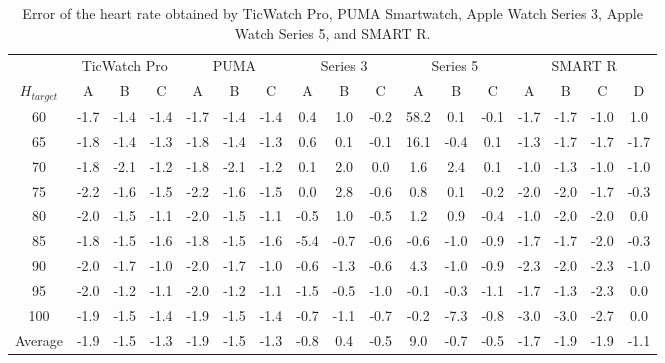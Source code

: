 \documentclass[sigchi,authordraft]{acmart}
\begin{document}
\begin{table}[!t]
  \centering
  \caption{Error of the heart rate obtained by TicWatch Pro, PUMA Smartwatch, Apple Watch Series 3, Apple Watch Series 5, and SMART R.}
  \begin{tabular}{c|ccc|ccc|ccc|ccc|cccc} 
  \toprule
    &\multicolumn{3}{c|}{TicWatch Pro}&\multicolumn{3}{c|}{PUMA}&\multicolumn{3}{c|}{Series 3}&\multicolumn{3}{c|}{Series 5}&\multicolumn{4}{c}{SMART R}\\
    $H_{target}$ & A & B & C & A & B & C & A & B & C & A & B & C & A & B & C & D\\    \midrule
    60 & -1.7 & -1.4 & -1.4 & -1.7 & -1.4 & -1.4 & 0.4 & 1.0 & -0.2 & 58.2 & 0.1 & -0.1 & -1.7 & -1.7 & -1.0 & 1.0\\
    65 & -1.8 & -1.4 & -1.3 & -1.8 & -1.4 & -1.3 & 0.6 & 0.1 & -0.1 & 16.1 & -0.4 & 0.1 & -1.3 & -1.7 & -1.7 & -1.7\\
    70 & -1.8 & -2.1 & -1.2 & -1.8 & -2.1 & -1.2 & 0.1 & 2.0 & 0.0 & 1.6 & 2.4 & 0.1 & -1.0 & -1.3 & -1.0 & -1.0\\
    75 & -2.2 & -1.6 & -1.5 & -2.2 & -1.6 & -1.5 & 0.0 & 2.8 & -0.6 & 0.8 & 0.1 & -0.2 & -2.0 & -2.0 & -1.7 & -0.3\\
    80 & -2.0 & -1.5 & -1.1 & -2.0 & -1.5 & -1.1 & -0.5 & 1.0 & -0.5 & 1.2 & 0.9 & -0.4 & -1.0 & -2.0 & -2.0 & 0.0\\
    85 & -1.8 & -1.5 & -1.6 & -1.8 & -1.5 & -1.6 & -5.4 & -0.7 & -0.6 & -0.6 & -1.0 & -0.9 & -1.7 & -1.7 & -2.0 & -0.3\\
    90 & -2.0 & -1.7 & -1.0 & -2.0 & -1.7 & -1.0 & -0.6 & -1.3 & -0.6 & 4.3 & -1.0 & -0.9 & -2.3 & -2.0 & -2.3 & -1.0\\
    95 & -2.0 & -1.2 & -1.1 & -2.0 & -1.2 & -1.1 & -1.5 & -0.5 & -1.0 & -0.1 & -0.3 & -1.1 & -1.7 & -1.3 & -2.3 & 0.0\\
    100 & -1.9 & -1.5 & -1.4 & -1.9 & -1.5 & -1.4 & -0.7 & -1.1 & -0.7 & -0.2 & -7.3 & -0.8 & -3.0 & -3.0 & -2.7 & 0.0\\
    \midrule
    Average & -1.9 & -1.5 & -1.3 & -1.9 & -1.5 & -1.3 & -0.8 & 0.4 & -0.5 & 9.0 & -0.7 & -0.5 & -1.7 & -1.9 & -1.9 & -1.1\\
    \bottomrule
  \end{tabular}
  \label{tab:result}
\end{table}
\end{document}
